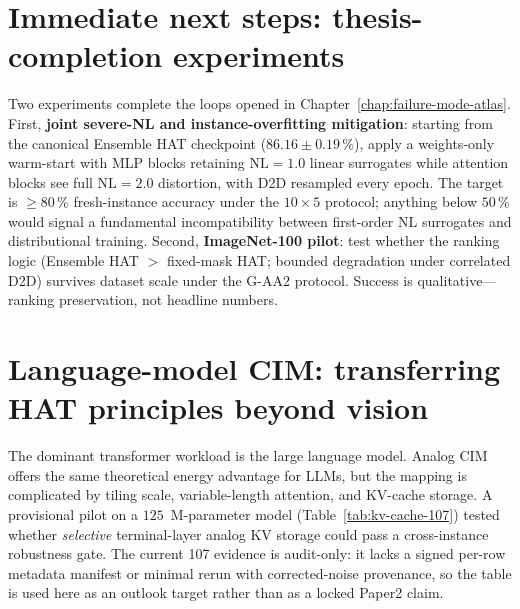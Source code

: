 \section{Immediate next steps: thesis-completion experiments}
\label{sec:immediate-next-steps}

Two experiments complete the loops opened in Chapter~\ref{chap:failure-mode-atlas}.  First, \textbf{joint severe-NL and instance-overfitting mitigation}: starting from the canonical Ensemble HAT checkpoint ($86.16\pm0.19\,\%$), apply a weights-only warm-start with MLP blocks retaining $\mathrm{NL}=1.0$ linear surrogates while attention blocks see full $\mathrm{NL}=2.0$ distortion, with D2D resampled every epoch.  The target is $\ge 80\,\%$ fresh-instance accuracy under the $10 \times 5$ protocol; anything below $50\,\%$ would signal a fundamental incompatibility between first-order NL surrogates and distributional training.  Second, \textbf{ImageNet-100 pilot}: test whether the ranking logic (Ensemble HAT $>$ fixed-mask HAT; bounded degradation under correlated D2D) survives dataset scale under the G-AA2 protocol.  Success is qualitative---ranking preservation, not headline numbers.


\section{Language-model CIM: transferring HAT principles beyond vision}
\label{sec:language-model-cim}

The dominant transformer workload is the large language model.  Analog CIM offers the same theoretical energy advantage for LLMs, but the mapping is complicated by tiling scale, variable-length attention, and KV-cache storage.  A provisional pilot on a $125$~M-parameter model (Table~\ref{tab:kv-cache-107}) tested whether \emph{selective} terminal-layer analog KV storage could pass a cross-instance robustness gate.  The current 107 evidence is audit-only: it lacks a signed per-row metadata manifest or minimal rerun with corrected-noise provenance, so the table is used here as an outlook target rather than as a locked Paper2 claim.

